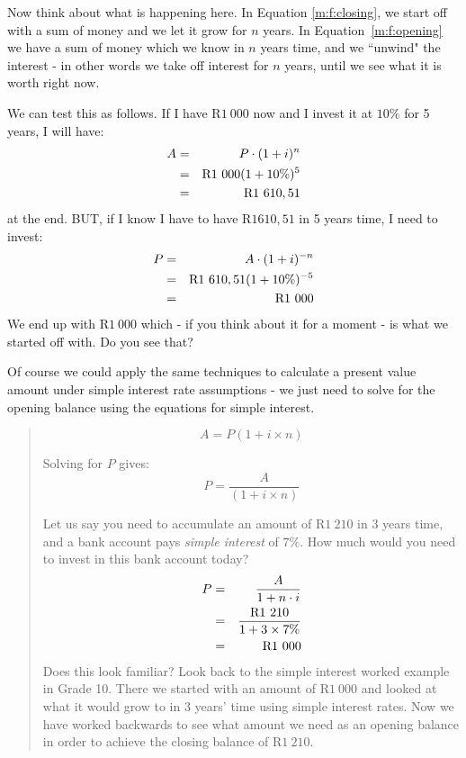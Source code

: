 Now think about what is happening here. In Equation \ref{m:f:closing}, we start off with a sum of money and we let it grow for $n$ years. In Equation~\ref{m:f:opening} we have a sum of money which we know in $n$ years time, and we ``unwind" the interest - in other words we take off interest for $n$ years, until we see what it is worth right now.

We can test this as follows. If I have R$1~000$ now and I invest it at $10\%$ for 5 years, I will have:
\begin{eqnarray*}
A &=& P \cdot (1+i)^n\\
&=&\rm{R}1~000(1+10\%)^5\\
&=&\rm{R}1~610,51
\end{eqnarray*}
at the end. BUT, if I know I have to have R$1 610,51$ in 5 years time, I need to invest:
\begin{eqnarray*}
P &=& A \cdot (1+i)^{-n}\\
&=&\rm{R}1~610,51(1+10\%)^{-5}\\
&=&\rm{R}1~000
\end{eqnarray*}
We end up with R$1~000$ which - if you think about it for a moment - is what we started off with. Do you see that?

Of course we could apply the same techniques to calculate a present value amount under simple interest rate assumptions - we just need to solve for the opening balance using the equations for simple interest.
\begin{quote}
{\begin{equation}
A = P (1 + i\times n)
\end{equation}

Solving for $P$ gives:
\begin{equation}
P = \frac{A}{(1 + i\times n)}
\end{equation}

Let us say you need to accumulate an amount of R$1~210$ in 3 years time, and a bank account pays \textit{simple interest} of $7\%$. How much would you need to invest in this bank account today?
\begin{eqnarray*}
P &=& \frac{A}{1 + n\cdot i}\\
&=& \frac{\rm{R}1~210}{ 1 + 3 \times 7\%}\\
&=& \rm{R}1~000
\end{eqnarray*}
Does this look familiar? Look back to the simple interest worked example in Grade 10. There we started with an amount of R$1~000$ and looked at what it would grow to in 3 years' time using simple interest rates. Now we have worked backwards to see what amount we need as an opening balance in order to achieve the closing balance of R$1~210$.}
\end{quote}

